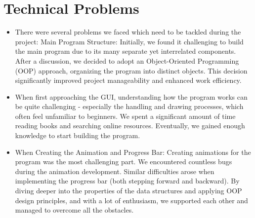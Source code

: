 \section{Technical Problems}
\begin{itemize}

    \item There were several problems we faced which need to be tackled during the project: 
    Main Program Structure: Initially, we found it challenging to build the main program due to its many separate yet interrelated components. After a discussion, we decided to adopt an Object-Oriented Programming (OOP) approach, organizing the program into distinct objects. This decision significantly improved project manageability and enhanced work efficiency.
    \item When first approaching the GUI, understanding how the program works can be quite challenging - especially the handling and drawing processes, which often feel unfamiliar to beginners. We spent a significant amount of time reading books and searching online resources. Eventually, we gained enough knowledge to start building the program.
    \item When Creating the Animation and Progress Bar: Creating animations for the program was the most challenging part. We encountered countless bugs during the animation development. Similar difficulties arose when implementing the progress bar (both stepping forward and backward). By diving deeper into the properties of the data structures and applying OOP design principles, and with a lot of enthusiasm, we supported each other and managed to overcome all the obstacles.

\end{itemize}



